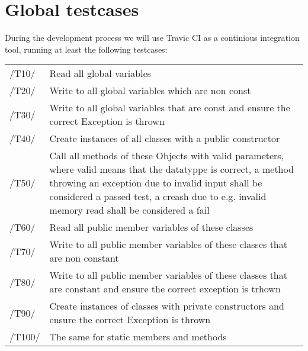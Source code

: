 \chapter{Global testcases}
During the development process we will use Travic CI as a continious integration tool, running at least the following testcases: \\

\begin{longtable}{|p{1cm} | p{15cm}|}
   \hline
  /T10/ & Read all global variables \\
  
  /T20/ & Write to all global variables which are non const \\
  
  /T30/ & Write to all global variables that are const and ensure the correct Exception is thrown \\
  
  /T40/ & Create instances of all classes with a public constructor \\
  
  /T50/ & Call all methods of these Objects with valid parameters, where valid means that the 	datatyppe is correct, a method throwing an exception due to invalid input shall be considered a passed test, a creash due to e.g. invalid memory read shall be considered a fail \\
  
  /T60/ & Read all public member variables of these classes \\
  
  /T70/ & Write to all public member variables of these classes that are non constant \\
  
  /T80/ & Write to all public member variables of these classes that are constant and ensure the correct exception is trhown \\
  
  /T90/ & Create instances of classes with private constructors and ensure the correct Exception is thrown \\
  
  /T100/ &  The same for static members and methods \\
   \hline
\end{longtable}